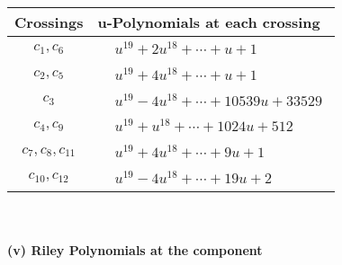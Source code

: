 \documentclass[1p]{elsarticle_modified}
\theoremstyle{definition}
\begin{document}
\begin{tabular}{m{50pt}|m{274pt}}
Crossings & \hspace{64pt}u-Polynomials at each crossing \\
\hline $$\begin{aligned}c_{1},c_{6}\end{aligned}$$&$\begin{aligned}
&u^{19}+2 u^{18}+\cdots+u+1
\end{aligned}$\\
\hline $$\begin{aligned}c_{2},c_{5}\end{aligned}$$&$\begin{aligned}
&u^{19}+4 u^{18}+\cdots+u+1
\end{aligned}$\\
\hline $$\begin{aligned}c_{3}\end{aligned}$$&$\begin{aligned}
&u^{19}-4 u^{18}+\cdots+10539 u+33529
\end{aligned}$\\
\hline $$\begin{aligned}c_{4},c_{9}\end{aligned}$$&$\begin{aligned}
&u^{19}+u^{18}+\cdots+1024 u+512
\end{aligned}$\\
\hline $$\begin{aligned}c_{7},c_{8},c_{11}\end{aligned}$$&$\begin{aligned}
&u^{19}+4 u^{18}+\cdots+9 u+1
\end{aligned}$\\
\hline $$\begin{aligned}c_{10},c_{12}\end{aligned}$$&$\begin{aligned}
&u^{19}-4 u^{18}+\cdots+19 u+2
\end{aligned}$\\
\hline
\end{tabular}\\~\\
\newpage\renewcommand{\arraystretch}{1}
\flushleft \textbf{(v) Riley Polynomials at the component}\newline \\
\end{document}
